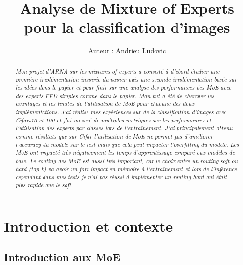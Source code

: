 \documentclass{article}
\title{Analyse de Mixture of Experts pour la classification d'images}
\author{Auteur : Andrieu Ludovic}
\begin{document}
\maketitle

\begin{abstract}
{\em
Mon projet d'ARNA sur les mixtures of experts a consisté à d'abord étudier une première implémentation inspirée du papier \cite{paper1} puis une seconde implémentation basée sur les idées dans le papier \cite{paper2} et pour finir sur une analyse des performances des MoE avec des experts FFD simples comme dans le papier. Mon but a été de chercher les avantages et les limites de l'utilisation de MoE pour chacune des deux implémentations. J'ai réalisé mes expériences sur de la classification d'images avec Cifar-10 et 100 et j'ai mesuré de multiples métriques sur les performances et l'utilisation des experts par classes lors de l'entraînement. J'ai principalement obtenu comme résultats que sur Cifar l'utilisation de MoE ne permet pas d'améliorer l'accuracy du modèle sur le test mais que cela peut impacter l'overfitting du modèle. Les MoE ont impacté très négativement les temps d'apprentissage comparé aux modèles de base. Le routing des MoE est aussi très important, car le choix entre un routing soft ou hard (top k) va avoir un fort impact en mémoire à l'entraînement et lors de l'inférence, cependant dans mes tests je n'ai pas réussi à implémenter un routing hard qui était plus rapide que le soft.
}
\end{abstract}

\section{Introduction et contexte}

\subsection{Introduction aux MoE}
\end{document}
